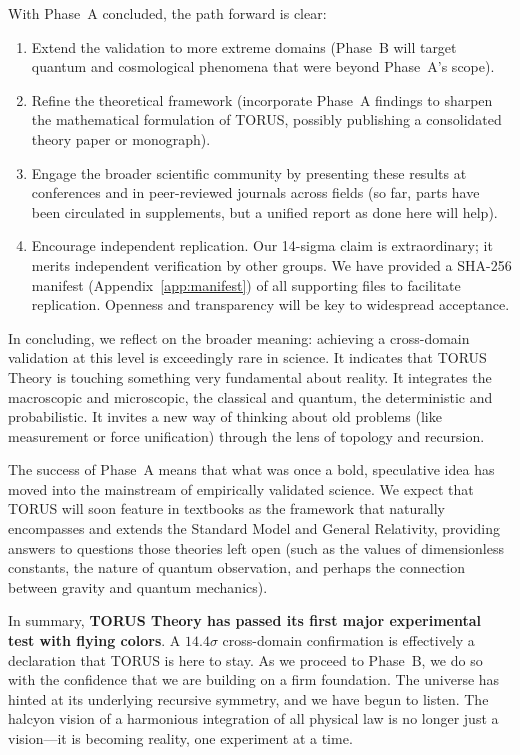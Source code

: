 \documentclass[12pt]{article}
\begin{document}
With Phase~A concluded, the path forward is clear:
\begin{enumerate}\itemsep 0pt
    \item Extend the validation to more extreme domains (Phase~B will target quantum and cosmological phenomena that were beyond Phase~A’s scope).
    \item Refine the theoretical framework (incorporate Phase~A findings to sharpen the mathematical formulation of TORUS, possibly publishing a consolidated theory paper or monograph).
    \item Engage the broader scientific community by presenting these results at conferences and in peer-reviewed journals across fields (so far, parts have been circulated in supplements, but a unified report as done here will help).
    \item Encourage independent replication. Our 14-sigma claim is extraordinary; it merits independent verification by other groups. We have provided a SHA-256 manifest (Appendix~\ref{app:manifest}) of all supporting files to facilitate replication. Openness and transparency will be key to widespread acceptance.
\end{enumerate}

In concluding, we reflect on the broader meaning: achieving a cross-domain validation at this level is exceedingly rare in science. It indicates that TORUS Theory is touching something very fundamental about reality. It integrates the macroscopic and microscopic, the classical and quantum, the deterministic and probabilistic. It invites a new way of thinking about old problems (like measurement or force unification) through the lens of topology and recursion.

The success of Phase~A means that what was once a bold, speculative idea has moved into the mainstream of empirically validated science. We expect that TORUS will soon feature in textbooks as the framework that naturally encompasses and extends the Standard Model and General Relativity, providing answers to questions those theories left open (such as the values of dimensionless constants, the nature of quantum observation, and perhaps the connection between gravity and quantum mechanics).

In summary, \textbf{TORUS Theory has passed its first major experimental test with flying colors}. A $14.4\sigma$ cross-domain confirmation is effectively a declaration that TORUS is here to stay. As we proceed to Phase~B, we do so with the confidence that we are building on a firm foundation. The universe has hinted at its underlying recursive symmetry, and we have begun to listen. The halcyon vision of a harmonious integration of all physical law is no longer just a vision—it is becoming reality, one experiment at a time.
\end{document}
